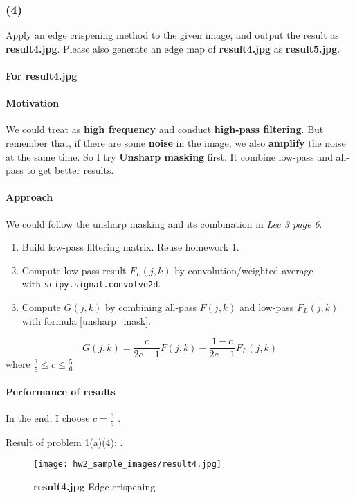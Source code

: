 \subsubsection{(4)}
Apply an edge crispening method to the given image, and output the result as \textbf{result4.jpg}. Please also generate an edge map of \textbf{result4.jpg} as \textbf{result5.jpg}.

\paragraph{For \textbf{result4.jpg}}
\paragraph{Motivation}
We could treat  as \textbf{high frequency} and conduct \textbf{high-pass filtering}. But remember that, if there are some \textbf{noise} in the image, we also \textbf{amplify} the noise at the same time. So I try \textbf{Unsharp masking} first. It combine low-pass and all-pass to get better results.

\paragraph{Approach}
We could follow the unsharp masking and its combination in \textit{Lec 3 page 6}.
\begin{enumerate}
    \item Build low-pass filtering matrix. Reuse homework 1.
    \item Compute low-pass result $F_{L}(j, k)$ by convolution/weighted average \\
    with \texttt{scipy.signal.convolve2d}.
    \item Compute $G(j, k)$ by combining all-pass $F(j, k)$ and low-pass $F_{L}(j, k)$ with formula \cref{unsharp_mask}.
\end{enumerate}

\begin{equation} \label{unsharp_mask}
    G(j, k) = \frac{c}{2c-1}F(j, k)-\frac{1-c}{2c-1}F_{L}(j, k)
\end{equation}
where $\frac{3}{5} \leq c \leq \frac{5}{6}$

\paragraph{Performance of results}
In the end, I choose $c=\frac{3}{5}$ .

Result of problem 1(a)(4): .
\begin{figure}
    \centering
    \texttt{[image: hw2\_sample\_images/result4.jpg]}
    \caption{\textbf{result4.jpg} Edge crispening}
    \label{result4}
\end{figure}

